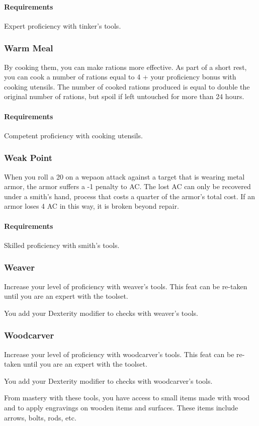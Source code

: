     \paragraph{Requirements} Expert proficiency with tinker's tools.
\subsubsection{Warm Meal} \label{feat::warmmeal}
    By cooking them, you can make rations more effective.
    As part of a short rest, you can cook a number of rations equal to 4 + your proficiency bonus with cooking utensils.
    The number of cooked rations produced is equal to double the original number of rations, but spoil if left untouched for more than 24 hours.
    \paragraph{Requirements} Competent proficiency with cooking utensils.
\subsubsection{Weak Point} \label{feat::weakpoint}
    When you roll a 20 on a wepaon attack against a target that is wearing metal armor, the armor suffers a -1 penalty to AC.
    The lost AC can only be recovered under a smith's hand, process that costs a quarter of the armor's total cost.
    If an armor loses 4 AC in this way, it is broken beyond repair.
    \paragraph{Requirements} Skilled proficiency with smith's tools.
\subsubsection{Weaver} \label{feat::weaver}
    Increase your level of proficiency with weaver's tools.
    This feat can be re-taken until you are an expert with the toolset.

    You add your Dexterity modifier to checks with weaver's tools.
\subsubsection{Woodcarver} \label{feat::woodcarver}
    Increase your level of proficiency with woodcarver's tools.
    This feat can be re-taken until you are an expert with the toolset.

    You add your Dexterity modifier to checks with woodcarver's tools.

    From mastery with these tools, you have access to small items made with wood and to apply engravings on wooden items and surfaces.
    These items include arrows, bolts, rods, etc.
\newpage~
\newpage
